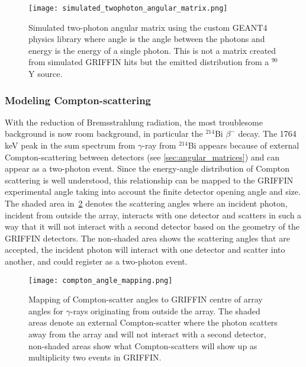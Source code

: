 \documentclass[cnatzke_thesis_proposal.tex]{subfiles}
\begin{document}
\begin{figure}[htbp]
  \centering
  \texttt{[image: simulated\_twophoton\_angular\_matrix.png]}
  \caption{Simulated two-photon angular matrix using the custom GEANT4 physics library where angle is the angle between the photons and energy is the energy of a single photon. This is not a matrix created from simulated GRIFFIN hits but the emitted distribution from a $^{90}$Y source.}
  \label{fig:simulated_twophoton_angular_matrix}
\end{figure}

\subsubsection{Modeling Compton-scattering}
\label{sec:compton_scatter}
With the reduction of Bremsstrahlung radiation, the most troublesome background is now room background, in particular the $^{214}$Bi $\beta^-$ decay.
The 1764 keV peak in the sum spectrum from $\gamma$-ray from $^{214}$Bi appears because of external Compton-scattering between detectors (see \ref{sec:angular_matrices}) and can appear as a two-photon event.
Since the energy-angle distribution of Compton scattering is well understood, this relationship can be mapped to the GRIFFIN experimental angle taking into account the finite detector opening angle and size.
The shaded area in~\ref{fig:compton_angle_mapping} denotes the scattering angles where an incident photon, incident from outside the array, interacts with one detector and scatters in such a way that it will not interact with a second detector based on the geometry of the GRIFFIN detectors. 
The non-shaded area shows the scattering angles that are accepted, the incident photon will interact with one detector and scatter into another, and could register as a two-photon event.


\begin{figure}[htbp]
  \centering
  \texttt{[image: compton\_angle\_mapping.png]}
  \caption{Mapping of Compton-scatter angles to GRIFFIN centre of array angles for $\gamma$-rays originating from outside the array. The shaded areas denote an external Compton-scatter where the photon scatters away from the array and will not interact with a second detector, non-shaded areas show what Compton-scatters will show up as multiplicity two events in GRIFFIN.}
  \label{fig:compton_angle_mapping}
\end{figure}
\end{document}
